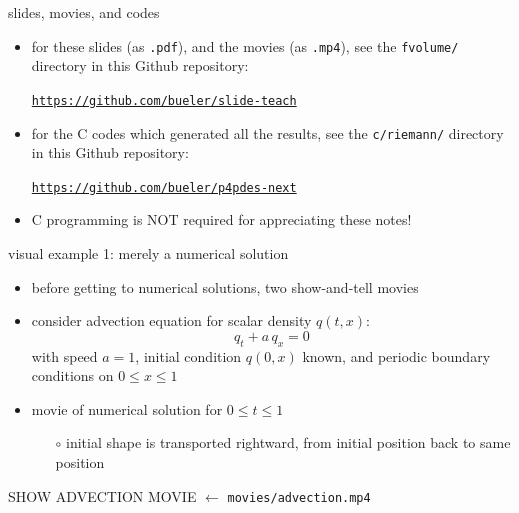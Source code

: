 \documentclass[10pt,dvipsnames,usepdftitle=false,
hyperref={pdftitle = {Finite volume methods},
    pdfauthor = {Ed Bueler}}]{beamer}
\begin{document}
\begin{frame}{slides, movies, and codes}
\begin{itemize}
\item for these \alert{slides} (as \texttt{.pdf}), and the \alert{movies} (as \texttt{.mp4}), see the \texttt{fvolume/} directory in this Github repository:
\begin{center}
\href{https://github.com/bueler/slide-teach}{\texttt{https://github.com/bueler/slide-teach}}
\end{center}

\bigskip
\item for the \alert{C codes} which generated all the results, see the \texttt{c/riemann/} directory in this Github repository:
\begin{center}
\href{https://github.com/bueler/p4pdes-next}{\texttt{https://github.com/bueler/p4pdes-next}}
\end{center}

\bigskip
\item C programming is \alert{NOT} required for appreciating these notes!
\end{itemize}
\end{frame}


\begin{frame}{visual example 1: merely a numerical solution}

\begin{itemize}
\item before getting to numerical solutions, two show-and-tell movies
\item consider advection equation for scalar density $q(t,x)$:
    $$q_t + a \, q_x = 0$$
with speed $a=1$, initial condition $q(0,x)$ known, and periodic boundary conditions on $0\le x \le 1$
\item movie of numerical solution for $0\le t \le 1$
    \begin{itemize}
    \item[$\circ$] initial shape is transported rightward, from initial position back to same position
    \end{itemize}
\end{itemize}

\vspace{10mm}
\begin{center}
\alert{SHOW ADVECTION MOVIE}  \qquad $\leftarrow$ \texttt{movies/advection.mp4}
\end{center}
\vspace{10mm}

\end{frame}
\end{document}
